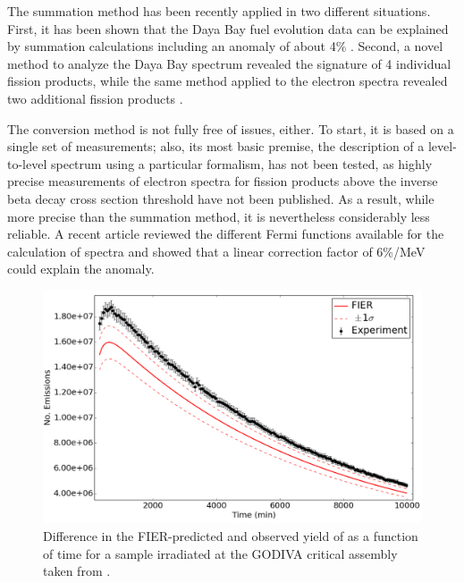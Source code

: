 \documentclass[letterpaper]{ar-1col}
\begin{document}
The summation method has been recently applied in two different situations.
  First, it has been shown that the Daya Bay fuel evolution data \cite{An17} can be explained by summation calculations including an anomaly of about 4\% \cite{Hay18}.
  Second, a novel method to analyze the Daya Bay spectrum revealed the signature of 4 individual fission products, while the same method applied to the electron spectra revealed two additional fission products \cite{Son18}.
  

The conversion method is not fully free of issues, either.
 To start, it is based on a single set of measurements; also, its most basic premise, the description of a level-to-level spectrum using a particular formalism, has not been tested, as highly precise measurements of electron spectra for fission products above the inverse beta decay cross section threshold have not been published.
   As a result, while more precise than the summation method, it is nevertheless considerably less reliable.
    A recent article \cite{Son17} reviewed the different Fermi functions available for the calculation of spectra and showed that a linear correction factor of 6\%/MeV could explain the anomaly.



\begin{figure}[b]
 \centering
 \includegraphics[width=0.7\linewidth]{667_before_alt.png}

 \caption{Difference in the FIER-predicted and observed yield of  as a function of time for a  sample irradiated at the GODIVA critical assembly taken from \cite{Matthews2018}.  }
 \label{fig:fier_plot}
\end{figure}
\end{document}
